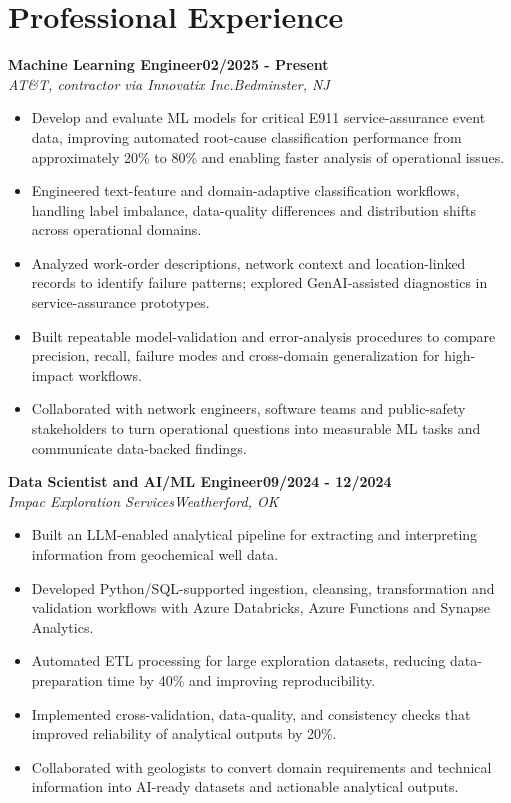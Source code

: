 \documentclass[9pt,letterpaper]{extarticle}
\newcommand{\role}[4]{%
  \Needspace{4\baselineskip}\textbf{#1}\hfill\textbf{#2}\\[-1pt]
  \textit{#3}\hfill\textit{#4}\par}
\begin{document}
\section{Professional Experience}
\role{Machine Learning Engineer}{02/2025 - Present}{AT\&T, contractor via Innovatix Inc.}{Bedminster, NJ}
\begin{itemize}
\item Develop and evaluate ML models for critical E911 service-assurance event data, improving automated root-cause classification performance from approximately 20\% to 80\% and enabling faster analysis of operational issues.
\item Engineered text-feature and domain-adaptive classification workflows, handling label imbalance, data-quality differences and distribution shifts across operational domains.
\item Analyzed work-order descriptions, network context and location-linked records to identify failure patterns; explored GenAI-assisted diagnostics in service-assurance prototypes.
\item Built repeatable model-validation and error-analysis procedures to compare precision, recall, failure modes and cross-domain generalization for high-impact workflows.
\item Collaborated with network engineers, software teams and public-safety stakeholders to turn operational questions into measurable ML tasks and communicate data-backed findings.
\end{itemize}
\role{Data Scientist and AI/ML Engineer}{09/2024 - 12/2024}{Impac Exploration Services}{Weatherford, OK}
\begin{itemize}
\item Built an LLM-enabled analytical pipeline for extracting and interpreting information from geochemical well data.
\item Developed Python/SQL-supported ingestion, cleansing, transformation and validation workflows with Azure Databricks, Azure Functions and Synapse Analytics.
\item Automated ETL processing for large exploration datasets, reducing data-preparation time by 40\% and improving reproducibility.
\item Implemented cross-validation, data-quality, and consistency checks that improved reliability of analytical outputs by 20\%.
\item Collaborated with geologists to convert domain requirements and technical information into AI-ready datasets and actionable analytical outputs.
\end{itemize}
\end{document}
